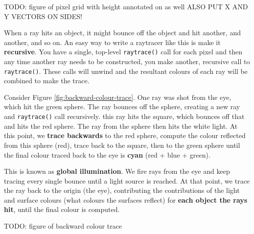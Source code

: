 \documentclass{article}
\begin{document}
TODO: figure of pixel grid with height annotated on as well ALSO PUT X AND Y VECTORS ON SIDES!

When a ray hits an object, it might bounce off the object and hit another, and another, and so on. An easy way to write a raytracer like this is make it \textbf{recursive}. You have a single, top-level \texttt{raytrace()} call for each pixel and then any time another ray needs to be constructed, you make another, recursive call to \texttt{raytrace()}. These calls will unwind and the resultant colours of each ray will be combined to make the trace.

Consider Figure \ref{fig:backward-colour-trace}. One ray was shot from the eye, which hit the green sphere. The ray bounces off the sphere, creating a new ray and \texttt{raytrace()} call recursively. this ray hits the square, which bounces off that and hits the red sphere. The ray from the sphere then hits the white light. At this point, we \textbf{trace backwards} to the red sphere, compute the colour reflected from this sphere (red), trace back to the square, then to the green sphere until the final colour traced back to the eye is \textbf{cyan} (red + blue + green).

This is known as \textbf{global illumination}. We fire rays from the eye and keep tracing every single bounce until a light source is reached. At that point, we trace the ray back to the origin (the eye), contributing the contributions of the light and surface colours (what colours the surfaces reflect) for \textbf{each object the rays hit}, until the final colour is computed.

TODO: figure of backward colour trace
\end{document}
